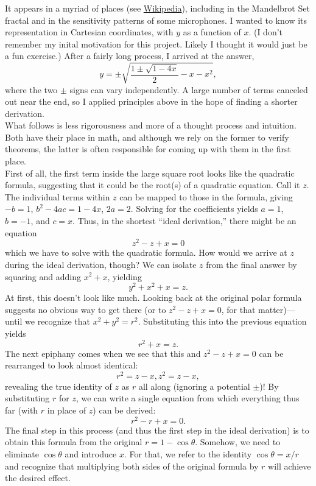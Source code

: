 \documentclass{article}
\begin{document}
It appears in a myriad of places (see \href{https://en.wikipedia.org/wiki/Cardioid#Properties}{Wikipedia}),
including in the Mandelbrot Set fractal and in the sensitivity patterns of some microphones.
I wanted to know its representation in Cartesian coordinates, with $y$ as a function of $x$.
(I don't remember my inital motivation for this project.
Likely I thought it would just be a fun exercise.)
After a fairly long process, I arrived at the answer,
\[y = \pm\sqrt{\frac{1\pm\sqrt{1-4x}}{2}-x-x^2},\]
where the two $\pm$ signs can vary independently.
A large number of terms canceled out near the end,
so I applied principles above
in the hope of finding a shorter derivation.\\

What follows is less rigorousness and more of a thought process and intuition.
Both have their place in math, and although we rely on the former to verify theorems,
the latter is often responsible for coming up with them in the first place.\\

First of all, the first term inside the large square root looks like the quadratic formula,
suggesting that it could be the root(s) of a quadratic equation.
Call it $z$.
The individual terms within $z$ can be mapped to those in the formula, giving
$-b=1$, $b^2-4ac=1-4x$, $2a=2$.
Solving for the coefficients yields $a=1$, $b=-1$, and $c=x$.
Thus, in the shortest ``ideal derivation,'' there might be an equation
\[z^2-z+x=0\]
which we have to solve with the quadratic formula.
How would we arrive at $z$ during the ideal derivation, though?
We can isolate $z$ from the final answer by squaring and adding $x^2+x$, yielding
\[y^2+x^2+x=z.\]
At first, this doesn't look like much.
Looking back at the original polar formula
suggests no obvious way to get there
(or to $z^2-z+x=0$, for that matter)---until we recognize that $x^2+y^2=r^2$.
Substituting this into the previous equation yields
\[r^2+x=z.\]
The next epiphany comes when we see that this and $z^2-z+x=0$ can be rearranged to look almost identical:
\[r^2=z-x, z^2=z-x,\]
revealing the true identity of $z$ as $r$ all along
(ignoring a potential $\pm$)!
By substituting $r$ for $z$, we can write a single equation from which everything thus far (with $r$ in place of $z$) can be derived:
\[r^2-r+x=0.\]
The final step in this process (and thus the first step in the ideal derivation)
is to obtain this formula from the original $r=1-\cos\theta$.
Somehow, we need to eliminate $\cos\theta$ and introduce $x$.
For that, we refer to the identity $\cos\theta=x/r$
and recognize that multiplying both sides of the original formula by $r$
will achieve the desired effect.\\
\end{document}

